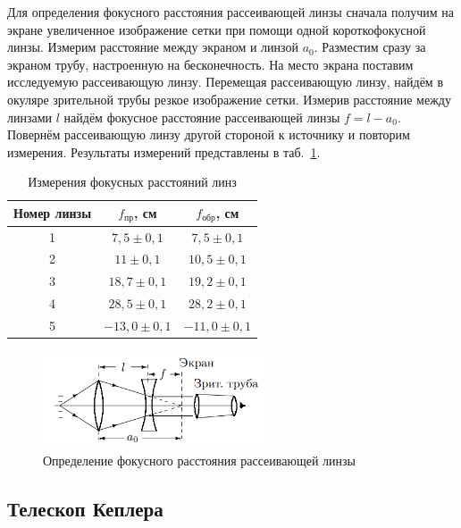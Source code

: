 \documentclass[a4paper, 12pt]{article}
\begin{document}
Для определения фокусного расстояния рассеивающей линзы сначала получим на экране увеличенное изображение сетки при помощи одной короткофокусной линзы. Измерим расстояние между экраном и линзой $a_0$. Разместим сразу за экраном трубу, настроенную на бесконечность. На место экрана поставим исследуемую рассеивающую линзу. Перемещая рассеивающую линзу, найдём в окуляре зрительной трубы резкое изображение сетки. Измерив расстояние между линзами $l$ найдём фокусное расстояние рассеивающей линзы $f = l - a_0$. Повернём рассеивающую линзу другой стороной к источнику и повторим измерения. Результаты измерений представлены в таб.~\ref{tab2}.

\begin{table}[h!]
\begin{center}
\begin{tabular}{|c|c|c|}
\hline 
Номер линзы & $f_{пр}$, см & $f_{обр}$, см \\ 
\hline 
1 & $7,5\pm0,1$ & $7,5\pm0,1$ \\ 
\hline 
2 & $11\pm0,1$ & $10,5\pm0,1$ \\ 
\hline 
3 & $18,7\pm0,1$ & $19,2\pm0,1$ \\ 
\hline 
4 & $28,5\pm0,1$ & $28,2\pm0,1$ \\ 
\hline
5 & $-13,0\pm0,1$ & $-11,0\pm0,1$ \\
\hline
\end{tabular} 
\end{center}
\caption{Измерения фокусных расстояний линз}
\label{tab2}
\end{table}

\begin{figure}[h!]
\begin{center}
	\includegraphics[width=0.6\textwidth]{minus_lens.png}
\end{center}
\caption{Определение фокусного расстояния рассеивающей линзы}
\label{fig:minus_lens}
\end{figure}

\subsection{Телескоп Кеплера}
\end{document}
